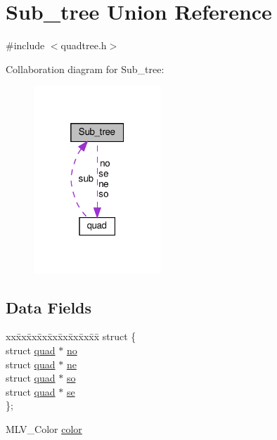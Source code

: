 \hypertarget{unionSub__tree}{}\section{Sub\+\_\+tree Union Reference}
\label{unionSub__tree}


{\ttfamily \#include $<$quadtree.\+h$>$}



Collaboration diagram for Sub\+\_\+tree\+:\nopagebreak
\begin{figure}[H]
\begin{center}
\leavevmode
\includegraphics[width=136pt]{unionSub__tree__coll__graph}
\end{center}
\end{figure}
\subsection*{Data Fields}
\begin{DoxyCompactItemize}
\item 
\begin{tabbing}
xx\=xx\=xx\=xx\=xx\=xx\=xx\=xx\=xx\=\kill
struct \{\\
\>struct \hyperlink{structquad}{quad} $\ast$ \hyperlink{unionSub__tree_a28ad496c9c80b56a820758dc35faf753}{no}\\
\>struct \hyperlink{structquad}{quad} $\ast$ \hyperlink{unionSub__tree_a8004244a3434aad839e127a7355d6c6a}{ne}\\
\>struct \hyperlink{structquad}{quad} $\ast$ \hyperlink{unionSub__tree_a85d306e53fc4bae2f6509e444272125c}{so}\\
\>struct \hyperlink{structquad}{quad} $\ast$ \hyperlink{unionSub__tree_acf5c7fe1df5d826c00a8ddc195841b45}{se}\\
\}; \\

\end{tabbing}\item 
M\+L\+V\+\_\+\+Color \hyperlink{unionSub__tree_a956a910a10f18245339a2dd0887bde98}{color}
\end{DoxyCompactItemize}


